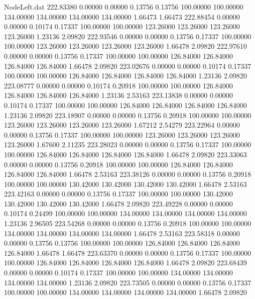\begin{filecontents}{NodeLeft.dat}
 222.83380    0.00000    0.00000     0.13756    0.13756  100.00000  100.00000  134.00000  134.00000  134.00000  134.00000    1.66473    1.66473
 222.88454    0.00000    0.00000     0.10174    0.17337  100.00000  100.00000  123.26000  123.26000  123.26000  123.26000    1.23136    2.09820
 222.93546    0.00000    0.00000     0.13756    0.17337  100.00000  100.00000  123.26000  123.26000  123.26000  123.26000    1.66478    2.09820
 222.97610    0.00000    0.00000     0.13756    0.17337  100.00000  100.00000  126.84000  126.84000  126.84000  126.84000    1.66478    2.09820
 223.02676    0.00000    0.00000     0.10174    0.17337  100.00000  100.00000  126.84000  126.84000  126.84000  126.84000    1.23136    2.09820
 223.08777    0.00000    0.00000     0.10174    0.20918  100.00000  100.00000  126.84000  126.84000  126.84000  126.84000    1.23136    2.53163
 223.13838    0.00000    0.00000     0.10174    0.17337  100.00000  100.00000  126.84000  126.84000  126.84000  126.84000    1.23136    2.09820
 223.18907    0.00000    0.00000     0.13756    0.20918  100.00000  100.00000  123.26000  123.26000  123.26000  123.26000    1.67212    2.54279
 223.22964    0.00000    0.00000     0.13756    0.17337  100.00000  100.00000  123.26000  123.26000  123.26000  123.26000    1.67600    2.11235
 223.28023    0.00000    0.00000     0.13756    0.17337  100.00000  100.00000  126.84000  126.84000  126.84000  126.84000    1.66478    2.09820
 223.33063    0.00000    0.00000     0.13756    0.20918  100.00000  100.00000  126.84000  126.84000  126.84000  126.84000    1.66478    2.53163
 223.38126    0.00000    0.00000     0.13756    0.20918  100.00000  100.00000  130.42000  130.42000  130.42000  130.42000    1.66478    2.53163
 223.42163    0.00000    0.00000     0.13756    0.17337  100.00000  100.00000  130.42000  130.42000  130.42000  130.42000    1.66478    2.09820
 223.49228    0.00000    0.00000     0.10174    0.24499  100.00000  100.00000  134.00000  134.00000  134.00000  134.00000    1.23136    2.96505
 223.54268    0.00000    0.00000     0.13756    0.20918  100.00000  100.00000  134.00000  134.00000  134.00000  134.00000    1.66478    2.53163
 223.58318    0.00000    0.00000     0.13756    0.13756  100.00000  100.00000  126.84000  126.84000  126.84000  126.84000    1.66478    1.66478
 223.63370    0.00000    0.00000     0.13756    0.17337  100.00000  100.00000  126.84000  126.84000  126.84000  126.84000    1.66478    2.09820
 223.68439    0.00000    0.00000     0.10174    0.17337  100.00000  100.00000  134.00000  134.00000  134.00000  134.00000    1.23136    2.09820
 223.73505    0.00000    0.00000     0.13756    0.17337  100.00000  100.00000  134.00000  134.00000  134.00000  134.00000    1.66478    2.09820

\end{filecontents}

